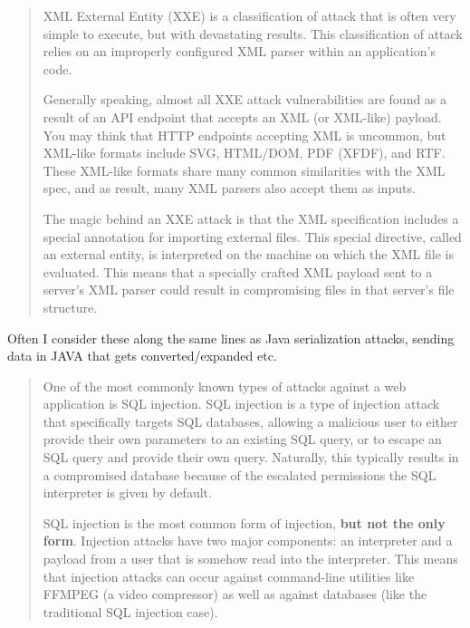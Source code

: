 \documentclass[Screen16to9,17pt]{foils}
\newcommand{\quotesize}{\fontsize{16pt}{20pt}\selectfont}
\begin{document}

\begin{quote}\quotesize
XML External Entity (XXE) is a classification of attack that is often very simple to execute, but with devastating results. This classification of attack relies on an improperly configured XML parser within an application’s code.

Generally speaking, almost all XXE attack vulnerabilities are found as a result of an API endpoint that accepts an XML (or XML-like) payload. You may think that HTTP endpoints accepting XML is uncommon, but XML-like formats include SVG, HTML/DOM, PDF (XFDF), and RTF. These XML-like formats share many common similarities with the XML spec, and as result, many XML parsers also accept them as inputs.

The magic behind an XXE attack is that the XML specification includes a special annotation for importing external files. This special directive, called an external entity, is interpreted on the machine on which the XML file is evaluated. This means that a specially crafted XML payload sent to a server’s XML parser could result in compromising files in that server’s file structure.
\end{quote}

\begin{list2}
  \item Often I consider these along the same lines as Java serialization attacks, sending data in JAVA that gets converted/expanded etc.
\end{list2}


\begin{quote}\quotesize
One of the most commonly known types of attacks against a web application is SQL injection. SQL injection is a type of injection attack that specifically targets SQL databases, allowing a malicious user to either provide their own parameters to an existing SQL query, or to escape an SQL query and provide their own query. Naturally, this typically results in a compromised database because of the escalated permissions the SQL interpreter is given by default.

SQL injection is the most common form of injection, {\bf but not the only form}. Injection attacks have two major components: an interpreter and a payload from a user that is somehow read into the interpreter. This means that injection attacks can occur against command-line utilities like FFMPEG (a video compressor) as well as against databases (like the traditional SQL injection case).
\end{quote}
\end{document}
